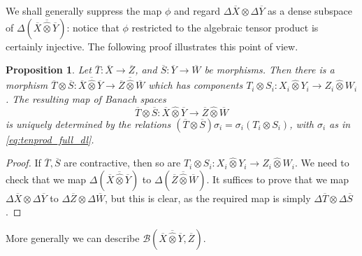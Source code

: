 \documentclass[a4paper,11pt]{article}
\theoremstyle{plain}
\newtheorem{proposition}{Proposition}[section]
\theoremstyle{remark}
\newcommand{\mc}[1]{\mathcal{#1}}
\newcommand{\proten}{\widehat\otimes}
\begin{document}
We shall generally suppress the map $\phi$ and regard $\Delta\overline X \otimes \Delta\overline Y$ as a dense subspace of $\Delta(\overline X \overline{\proten} \overline Y)$: notice that $\phi$ restricted to the algebraic tensor product is certainly injective.  The following proof illustrates this point of view.

\begin{proposition}\label{prop:tenprod_morphisms}
Let $\overline T \colon \overline X \to \overline Z$, and $\overline S \colon \overline Y \to \overline W$ be morphisms.  Then there is a morphism $\overline T \otimes \overline S \colon \overline X \overline{\proten} \overline Y \to \overline Z \overline{\proten} \overline W$ which has components $T_i\otimes S_i \colon X_i\proten Y_i \to Z_i\proten W_i$.  The resulting map of Banach spaces
\[ \overline T \otimes \overline S \colon \overline X \proten \overline Y \to \overline Z \proten \overline W \]
is uniquely determined by the relations $(\overline T \otimes \overline S) \sigma_i = \sigma_i (T_i \otimes S_i)$, with $\sigma_i$ as in \eqref{eq:tenprod_full_dl}.
\end{proposition}
\begin{proof}
If $\overline T, \overline S$ are contractive, then so are $T_i\otimes S_i \colon X_i\proten Y_i \to Z_i\proten W_i$.  We need to check that we map $\Delta(\overline X \overline{\proten} \overline Y)$ to $\Delta(\overline Z \overline{\proten} \overline W)$.  It suffices to prove that we map $\Delta\overline X \otimes \Delta\overline Y$ to $\Delta\overline Z \otimes \Delta\overline W$, but this is clear, as the required map is simply $\Delta\overline T \otimes \Delta\overline S$.
\end{proof}

More generally we can describe $\mc B(\overline X\overline\proten\overline Y, \overline Z)$.
\end{document}
